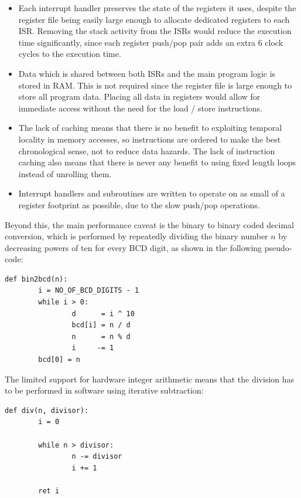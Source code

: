 \documentclass[12pt,a4paper]{article}
\begin{document}
\begin{itemize}
\item Each interrupt handler preserves the state of the registers it
  uses, despite the register file being easily large enough to
  allocate dedicated registers to each ISR. Removing the stack
  activity from the ISRs would reduce the execution time
  significantly, since each register push/pop pair adds an extra 6
  clock cycles to the execution time.
\item Data which is shared between both ISRs and the main program
  logic is stored in RAM. This is not required since the register file
  is large enough to store all program data. Placing all data in
  registers would allow for immediate access without the need for the
  load / store instructions.
\item The lack of caching means that there is no benefit to exploiting
  temporal locality in memory accesses, so instructions are ordered to
  make the best chronological sense, not to reduce data hazards. The
  lack of instruction caching also means that there is never any
  benefit to using fixed length loops instead of unrolling them.
\item Interrupt handlers and subroutines are written to operate on as
  small of a register footprint as possible, due to the slow push/pop
  operations.
\end{itemize}

Beyond this, the main performance caveat is the binary to binary coded
decimal conversion, which is performed by repeatedly dividing the
binary number $n$ by decreasing powers of ten for every BCD digit, as
shown in the following pseudo-code:

\begin{verbatim}
def bin2bcd(n):
        i = NO_OF_BCD_DIGITS - 1
        while i > 0:
                d      = i ^ 10
                bcd[i] = n / d
                n      = n % d
                i     -= 1
        bcd[0] = n
\end{verbatim}

The limited support for hardware integer arithmetic means that the
division has to be performed in software using iterative subtraction:

\begin{verbatim}
def div(n, divisor):
        i = 0

        while n > divisor:
                n -= divisor
                i += 1

        ret i
\end{verbatim}
\end{document}
